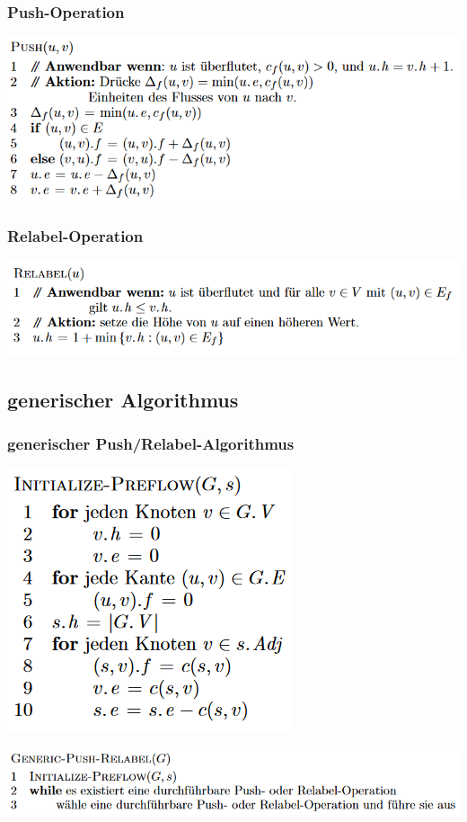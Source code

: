 \documentclass{beamer}
\newcommand{\pr}{Push/Relabel}
\begin{document}
\begin{frame}
\frametitle{Push-Operation}
\begin{adjustbox}{width = \textwidth}
\includegraphics{../Grafiken/Push.png}
\end{adjustbox}
\end{frame}

\begin{frame}
\frametitle{Relabel-Operation}
\begin{adjustbox}{width = \textwidth}
\includegraphics{../Grafiken/Relabel.png}
\end{adjustbox}
\end{frame}

\subsection{generischer Algorithmus}
\begin{frame}
\frametitle{generischer \pr -Algorithmus}
\centering
\begin{adjustbox}{width = 0.5\textwidth}
\includegraphics{../Grafiken/Init-Preflow.png}
\end{adjustbox}
\begin{adjustbox}{width = \textwidth}
\includegraphics{../Grafiken/Generic-PR.png}
\end{adjustbox}
\end{frame}
\end{document}
